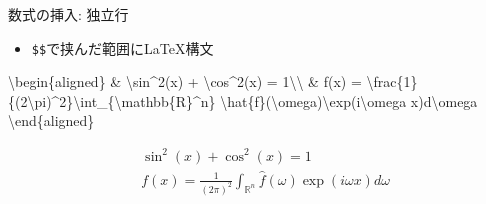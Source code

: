 \documentclass[
  12pt,
  ignorenonframetext,
]{beamer}
\newenvironment{Shaded}{\begin{snugshade}}{\end{snugshade}}
\newcommand{\SpecialCharTok}[1]{\textcolor[rgb]{0.00,0.00,0.00}{#1}}
\newcommand{\SpecialStringTok}[1]{\textcolor[rgb]{0.31,0.60,0.02}{#1}}
\providecommand{\tightlist}{%
  \setlength{\itemsep}{0pt}\setlength{\parskip}{0pt}}
\begin{document}
\begin{frame}[fragile]{数式の挿入: 独立行}
\protect\hypertarget{ux6570ux5f0fux306eux633fux5165-ux72ecux7acbux884c}{}

\begin{itemize}
\tightlist
\item
  \texttt{\$\$}で挟んだ範囲に\LaTeX 構文
\end{itemize}

\begin{Shaded}
\begin{Highlighting}[]
\SpecialStringTok{$$}\SpecialCharTok{\textbackslash{}begin}\SpecialStringTok{\{aligned\}}
\SpecialStringTok{& }\SpecialCharTok{\textbackslash{}sin}\SpecialStringTok{^2(x) + }\SpecialCharTok{\textbackslash{}cos}\SpecialStringTok{^2(x) = 1}\SpecialCharTok{\textbackslash{}\textbackslash{}}
\SpecialStringTok{& f(x) = }\SpecialCharTok{\textbackslash{}frac}\SpecialStringTok{\{1\}\{(2}\SpecialCharTok{\textbackslash{}pi}\SpecialStringTok{)^2\}}\SpecialCharTok{\textbackslash{}int}\SpecialStringTok{_\{}\SpecialCharTok{\textbackslash{}mathbb}\SpecialStringTok{\{R\}^n\}}
\SpecialCharTok{\textbackslash{}hat}\SpecialStringTok{\{f\}(}\SpecialCharTok{\textbackslash{}omega}\SpecialStringTok{)}\SpecialCharTok{\textbackslash{}exp}\SpecialStringTok{(i}\SpecialCharTok{\textbackslash{}omega}\SpecialStringTok{ x)d}\SpecialCharTok{\textbackslash{}omega}
\SpecialCharTok{\textbackslash{}end}\SpecialStringTok{\{aligned\}$$}
\end{Highlighting}
\end{Shaded}

\[\begin{aligned}
& \sin^2(x) + \cos^2(x) = 1\\
& f(x) = \frac{1}{(2\pi)^2}\int_{\mathbb{R}^n}\hat{f}(\omega)\exp(i\omega x)d\omega
\end{aligned}\]

\end{frame}
\end{document}
